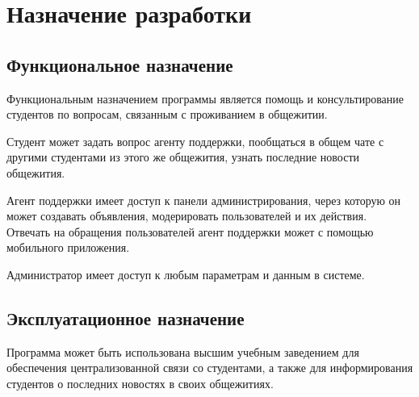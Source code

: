 \section{Назначение разработки}

\subsection{Функциональное назначение}

Функциональным назначением программы является помощь и консультирование студентов по вопросам, связанным
с проживанием в общежитии.

Студент может задать вопрос агенту поддержки, пообщаться в общем чате с другими
студентами из этого же общежития, узнать последние новости общежития.

Агент поддержки имеет доступ к панели администрирования, через которую он может создавать объявления, модерировать пользователей и их действия.
Отвечать на обращения пользователей агент поддержки может с помощью мобильного приложения.

Администратор имеет доступ к любым параметрам и данным в системе.

\subsection{Эксплуатационное назначение}

Программа может быть использована высшим учебным заведением для обеспечения централизованной связи со студентами, а
также для информирования студентов о последних новостях в своих общежитиях.
